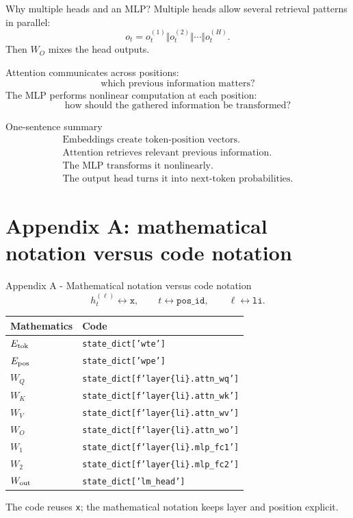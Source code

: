 \documentclass[
  xcolor={svgnames,dvipsnames},
  hyperref={pagebackref,bookmarks},
  aspectratio=169,
  11pt
]{beamer}
\begin{document}
\begin{frame}{Why multiple heads and an MLP?}
Multiple heads allow several retrieval patterns in parallel:
\[
o_t=o_t^{(1)}\Vert o_t^{(2)}\Vert\cdots\Vert o_t^{(H)}.
\]
Then $W_O$ mixes the head outputs.

\vspace{0.4cm}
Attention communicates across positions:
\[
\boxed{\text{which previous information matters?}}
\]
The MLP performs nonlinear computation at each position:
\[
\boxed{\text{how should the gathered information be transformed?}}
\]
\end{frame}

\begin{frame}{One-sentence summary}
\centering
\Large
\[
\boxed{
\begin{gathered}
\text{Embeddings create token-position vectors.}\\
\text{Attention retrieves relevant previous information.}\\
\text{The MLP transforms it nonlinearly.}\\
\text{The output head turns it into next-token probabilities.}
\end{gathered}}
\]
\end{frame}


\appendix
\section{Appendix A: mathematical notation versus code notation}
\begin{frame}{Appendix A - Mathematical notation versus code notation}
\small
\[
h_t^{(\ell)}\leftrightarrow \texttt{x},\qquad
 t\leftrightarrow\texttt{pos\_id},\qquad
 \ell\leftrightarrow\texttt{li}.
\]
\begin{center}
\begin{tabular}{ll}
\toprule
Mathematics & Code \\
\midrule
$E_{\rm tok}$ & \texttt{state\_dict['wte']} \\
$E_{\rm pos}$ & \texttt{state\_dict['wpe']} \\
$W_Q$ & \texttt{state\_dict[f'layer\{li\}.attn\_wq']} \\
$W_K$ & \texttt{state\_dict[f'layer\{li\}.attn\_wk']} \\
$W_V$ & \texttt{state\_dict[f'layer\{li\}.attn\_wv']} \\
$W_O$ & \texttt{state\_dict[f'layer\{li\}.attn\_wo']} \\
$W_1$ & \texttt{state\_dict[f'layer\{li\}.mlp\_fc1']} \\
$W_2$ & \texttt{state\_dict[f'layer\{li\}.mlp\_fc2']} \\
$W_{\rm out}$ & \texttt{state\_dict['lm\_head']} \\
\bottomrule
\end{tabular}
\end{center}
The code reuses \texttt{x}; the mathematical notation keeps layer and position explicit.
\end{frame}
\end{document}
